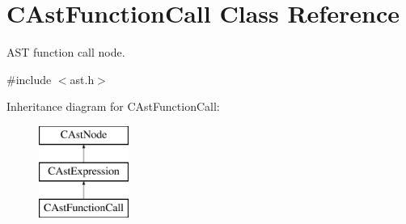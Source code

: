\hypertarget{classCAstFunctionCall}{\section{C\-Ast\-Function\-Call Class Reference}
\label{classCAstFunctionCall}
}


A\-S\-T function call node.  




{\ttfamily \#include $<$ast.\-h$>$}

Inheritance diagram for C\-Ast\-Function\-Call\-:\begin{figure}[H]
\begin{center}
\leavevmode
\includegraphics[height=3.000000cm]{classCAstFunctionCall}
\end{center}
\end{figure}

